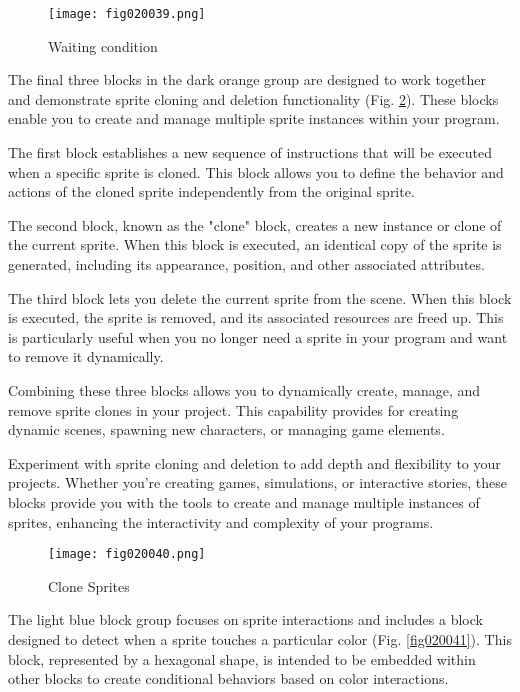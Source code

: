 \begin{figure}[H]
   \centering
   \texttt{[image: fig020039.png]}
   \caption{Waiting condition}
\label{fig020039}
\end{figure}

The final three blocks in the dark orange group are designed to work together and demonstrate sprite cloning and deletion functionality (Fig. \ref{fig020040}). These blocks enable you to create and manage multiple sprite instances within your program.

The first block establishes a new sequence of instructions that will be executed when a specific sprite is cloned. This block allows you to define the behavior and actions of the cloned sprite independently from the original sprite.

The second block, known as the "clone" block, creates a new instance or clone of the current sprite. When this block is executed, an identical copy of the sprite is generated, including its appearance, position, and other associated attributes.

The third block lets you delete the current sprite from the scene. When this block is executed, the sprite is removed, and its associated resources are freed up. This is particularly useful when you no longer need a sprite in your program and want to remove it dynamically.

Combining these three blocks allows you to dynamically create, manage, and remove sprite clones in your project. This capability provides for creating dynamic scenes, spawning new characters, or managing game elements.

Experiment with sprite cloning and deletion to add depth and flexibility to your projects. Whether you're creating games, simulations, or interactive stories, these blocks provide you with the tools to create and manage multiple instances of sprites, enhancing the interactivity and complexity of your programs.

\begin{figure}[H]
   \centering
   \texttt{[image: fig020040.png]}
   \caption{Clone Sprites}
\label{fig020040}
\end{figure}

The light blue block group focuses on sprite interactions and includes a block designed to detect when a sprite touches a particular color (Fig. \ref{fig020041}). This block, represented by a hexagonal shape, is intended to be embedded within other blocks to create conditional behaviors based on color interactions.

